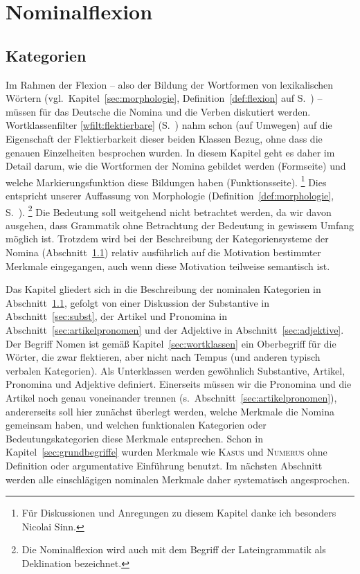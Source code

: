 \chapter{Nominalflexion}

\label{sec:flektierbare}
\label{sec:nomina}

\section{Kategorien}

\label{sec:nomeneinl}

Im Rahmen der Flexion -- also der Bildung der Wortformen von lexikalischen Wörtern (vgl.\ Kapitel~\ref{sec:morphologie}, Definition~\ref{def:flexion} auf S.~\pageref{def:flexion}) -- müssen für das Deutsche die Nomina und die Verben diskutiert werden.
Wortklassenfilter \ref{wfilt:flektierbare} (S.~\pageref{wfilt:flektierbare}) nahm schon (auf Umwegen) auf die Eigenschaft der Flektierbarkeit dieser beiden Klassen Bezug, ohne dass die genauen Einzelheiten besprochen wurden.
In diesem Kapitel geht es daher im Detail darum, wie die Wortformen der Nomina gebildet werden (Formseite) und welche Markierungsfunktion diese Bildungen haben (Funktionsseite).%
\footnote{Für Diskussionen und Anregungen zu diesem Kapitel danke ich besonders Nicolai Sinn.}
Dies entspricht unserer Auffassung von Morphologie (Definition~\ref{def:morphologie}, S.~\pageref{def:morphologie}).%
\footnote{Die Nominalflexion wird auch mit dem Begriff der Lateingrammatik als Deklination bezeichnet.}
Die Bedeutung soll weitgehend nicht betrachtet werden, da wir davon ausgehen, dass Grammatik ohne Betrachtung der Bedeutung in gewissem Umfang möglich ist.
Trotzdem wird bei der Beschreibung der Kategoriensysteme der Nomina (Abschnitt~\ref{sec:nomeneinl}) relativ ausführlich auf die Motivation bestimmter Merkmale eingegangen, auch wenn diese Motivation teilweise semantisch ist.

Das Kapitel gliedert sich in die Beschreibung der nominalen Kategorien in Abschnitt~\ref{sec:nomeneinl}, gefolgt von einer Diskussion der Substantive in Abschnitt~\ref{sec:subst}, der Artikel und Pronomina in Abschnitt~\ref{sec:artikelpronomen} und der Adjektive in Abschnitt~\ref{sec:adjektive}.
Der Begriff Nomen ist gemäß Kapitel~\ref{sec:wortklassen} ein Oberbegriff für die Wörter, die zwar flektieren, aber nicht nach Tempus (und anderen typisch verbalen Kategorien).
Als Unterklassen werden gewöhnlich Substantive, Artikel, Pronomina und Adjektive definiert.
Einerseits müssen wir die Pronomina und die Artikel noch genau voneinander trennen (s.\ Abschnitt~\ref{sec:artikelpronomen}), andererseits soll hier zunächst überlegt werden, welche Merkmale die Nomina gemeinsam haben, und welchen funktionalen Kategorien oder Bedeutungskategorien diese Merkmale entsprechen.
Schon in Kapitel~\ref{sec:grundbegriffe} wurden Merkmale wie \textsc{Kasus} und \textsc{Numerus} ohne Definition oder argumentative Einführung benutzt.
Im nächsten Abschnitt werden alle einschlägigen nominalen Merkmale daher systematisch angesprochen.

